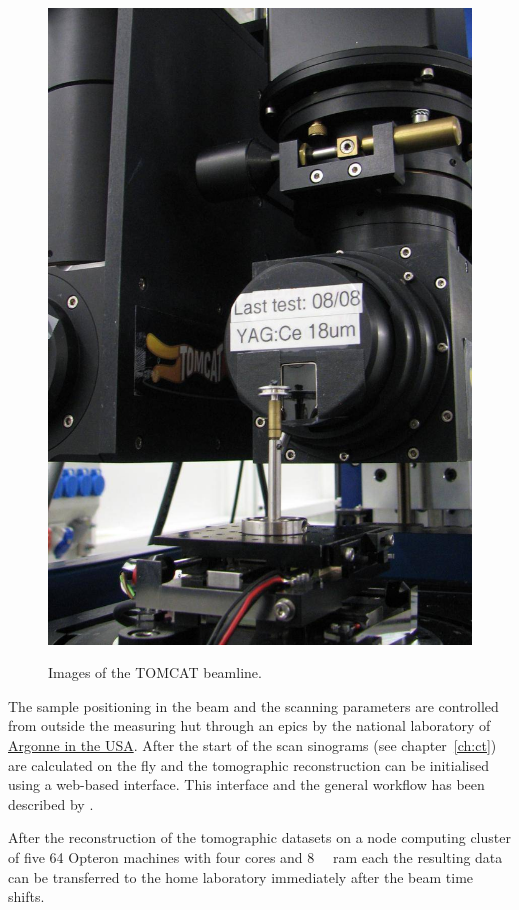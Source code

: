 \begin{figure}[htb]
{		\includegraphics[width=\imsize]{img/TOMCAT2}%
		\label{subfig:TOMCAT2}%
		}%
	\caption{Images of the TOMCAT beamline.}
\end{figure}

The sample positioning in the beam and the scanning parameters are controlled from outside the measuring hut through an \ac{epics} by the national laboratory of \href{http://www.aps.anl.gov/epics/}{Argonne in the USA}. After the start of the scan sinograms (see chapter~\ref{ch:ct}) are calculated on the fly and the tomographic reconstruction can be initialised using a web-based interface. This interface and the general workflow has been described by \citet{Hintermueller2010}.

After the reconstruction of the tomographic datasets on a node computing cluster of five \SI{64}{\bit} Opteron machines with four cores and \SI{8}{\giga\byte} \acs{ram} each the resulting data can be transferred to the home laboratory immediately after the beam time shifts.